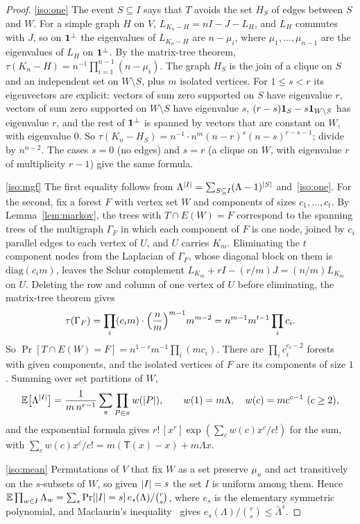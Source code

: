 \begin{proof}
\ref{iso:one} The event $S\subseteq I$ says that $T$ avoids the set $H_S$ of edges between $S$ and $W$. For a simple graph $H$ on $V$, $L_{K_n-H}=nI-J-L_H$, and $L_H$ commutes with $J$, so on $\mathbf{1}^\perp$ the eigenvalues of $L_{K_n-H}$ are $n-\mu_i$, where $\mu_1,\dots,\mu_{n-1}$ are the eigenvalues of $L_H$ on $\mathbf{1}^\perp$. By the matrix-tree theorem, $\tau(K_n-H)=n^{-1}\prod_{i=1}^{n-1}(n-\mu_i)$. The graph $H_S$ is the join of a clique on $S$ and an independent set on $W\setminus S$, plus $m$ isolated vertices. For $1\le s<r$ its eigenvectors are explicit: vectors of sum zero supported on $S$ have eigenvalue $r$, vectors of sum zero supported on $W\setminus S$ have eigenvalue $s$, $(r-s)\mathbf{1}_S-s\mathbf{1}_{W\setminus S}$ has eigenvalue $r$, and the rest of $\mathbf{1}^\perp$ is spanned by vectors that are constant on $W$, with eigenvalue $0$. So $\tau(K_n-H_S)=n^{-1}\cdot n^m(n-r)^s(n-s)^{r-s-1}$; divide by $n^{n-2}$. The cases $s=0$ (no edges) and $s=r$ (a clique on $W$, with eigenvalue $r$ of multiplicity $r-1$) give the same formula.

\ref{iso:mgf} The first equality follows from $\Lambda^{\lvert I\rvert}=\sum_{S\subseteq I}(\Lambda-1)^{\lvert S\rvert}$ and~\ref{iso:one}. For the second, fix a forest $F$ with vertex set $W$ and components of sizes $c_1,\dots,c_t$. By Lemma~\ref{lem:markov}, the trees with $T\cap E(W)=F$ correspond to the spanning trees of the multigraph $\Gamma_F$ in which each component of $F$ is one node, joined by $c_i$ parallel edges to each vertex of $U$, and $U$ carries $K_m$. Eliminating the $t$ component nodes from the Laplacian of $\Gamma_F$, whose diagonal block on them is $\mathrm{diag}(c_im)$, leaves the Schur complement $L_{K_m}+rI-(r/m)J=(n/m)L_{K_m}$ on $U$. Deleting the row and column of one vertex of $U$ before eliminating, the matrix-tree theorem gives
\[
  \tau(\Gamma_F)=\prod_i(c_im)\cdot\Bigl(\frac nm\Bigr)^{m-1}m^{m-2}=n^{m-1}m^{t-1}\prod_ic_i .
\]
So $\Pr[T\cap E(W)=F]=n^{1-r}m^{-1}\prod_i(mc_i)$. There are $\prod_ic_i^{c_i-2}$ forests with given components, and the isolated vertices of $F$ are its components of size $1$. Summing over set partitions of $W$,
\[
  \mathbb{E}\bigl[\Lambda^{\lvert I\rvert}\bigr]=\frac1{m\,n^{r-1}}\sum_{\pi}\prod_{P\in\pi}w(\lvert P\rvert),\qquad w(1)=m\Lambda,\quad w(c)=mc^{c-1}\ (c\ge2),
\]
and the exponential formula gives $r!\,[x^r]\exp(\sum_cw(c)x^c/c!)$ for the sum, with $\sum_cw(c)x^c/c!=m(\mathsf T(x)-x)+m\Lambda x$.

\ref{iso:mean} Permutations of $V$ that fix $W$ as a set preserve $\mu_n$ and act transitively on the $s$-subsets of $W$, so given $\lvert I\rvert=s$ the set $I$ is uniform among them. Hence $\mathbb{E}\prod_{w\in I}\Lambda_w=\sum_s\Pr[\lvert I\rvert=s]\,e_s(\Lambda)/\binom rs$, where $e_s$ is the elementary symmetric polynomial, and Maclaurin's inequality~\cite{HLP52} gives $e_s(\Lambda)/\binom rs\le\bar\Lambda^s$.
\end{proof}

